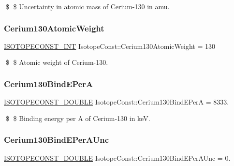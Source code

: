 \$ \$ Uncertainty in atomic mass of Cerium-\/130 in amu. \mbox{\label{group___isotope_const-_cerium-_ce130_ga085aa3b74fb824f7d421ff93a359ad42}} 
\subsubsection{\texorpdfstring{Cerium130\+Atomic\+Weight}{Cerium130AtomicWeight}}
{\footnotesize\ttfamily \mbox{\hyperlink{group___isotope_const-_macros_ga5f18360b3e99483a35c32d789e62621c}{I\+S\+O\+T\+O\+P\+E\+C\+O\+N\+S\+T\+\_\+\+I\+NT}} Isotope\+Const\+::\+Cerium130\+Atomic\+Weight = 130}

\$ \$ Atomic weight of Cerium-\/130. \mbox{\label{group___isotope_const-_cerium-_ce130_ga9145c57bcd0b85b40423a0f4b6a1ae0e}} 
\subsubsection{\texorpdfstring{Cerium130\+Bind\+E\+PerA}{Cerium130BindEPerA}}
{\footnotesize\ttfamily \mbox{\hyperlink{group___isotope_const-_macros_ga8f45a7272ce02c0b4c65c44636ed719a}{I\+S\+O\+T\+O\+P\+E\+C\+O\+N\+S\+T\+\_\+\+D\+O\+U\+B\+LE}} Isotope\+Const\+::\+Cerium130\+Bind\+E\+PerA = 8333.}

\$ \$ Binding energy per A of Cerium-\/130 in keV. \mbox{\label{group___isotope_const-_cerium-_ce130_ga0dd7269803fbec33553dea41335f87b1}} 
\subsubsection{\texorpdfstring{Cerium130\+Bind\+E\+Per\+A\+Unc}{Cerium130BindEPerAUnc}}
{\footnotesize\ttfamily \mbox{\hyperlink{group___isotope_const-_macros_ga8f45a7272ce02c0b4c65c44636ed719a}{I\+S\+O\+T\+O\+P\+E\+C\+O\+N\+S\+T\+\_\+\+D\+O\+U\+B\+LE}} Isotope\+Const\+::\+Cerium130\+Bind\+E\+Per\+A\+Unc = 0.}

